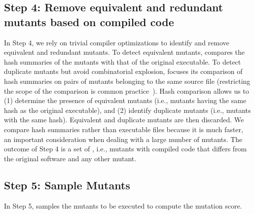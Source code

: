\subsection{Step 4: Remove equivalent and redundant mutants based on compiled code}

In Step 4, we rely on trivial compiler optimizations to identify and remove equivalent and redundant mutants.
To detect equivalent mutants, \APPR compares the hash summaries of the mutants with that of the original executable. To detect duplicate mutants but avoid combinatorial explosion, \APPR focuses its comparison of hash summaries on pairs of mutants belonging to the same source file (restricting the scope of the comparison is common practice~\cite{kintis2017detecting}).
Hash comparison allows us to (1) determine the presence of equivalent mutants (i.e., mutants having the same hash as the original executable), and (2) identify duplicate mutants (i.e., mutants with the same hash). %
Equivalent and duplicate mutants are then discarded. We compare hash summaries rather than executable files because it is much faster, an important consideration when dealing with a large number of mutants.
The outcome of Step 4 is a set of , i.e., mutants with compiled code that differs from the original software and any other mutant.


\subsection{Step 5: Sample Mutants}
\label{sec:codeDriven:samplingStep}
\STARTCHANGEDNOV


In Step 5, \APPR samples the mutants to be executed to compute the mutation score.


